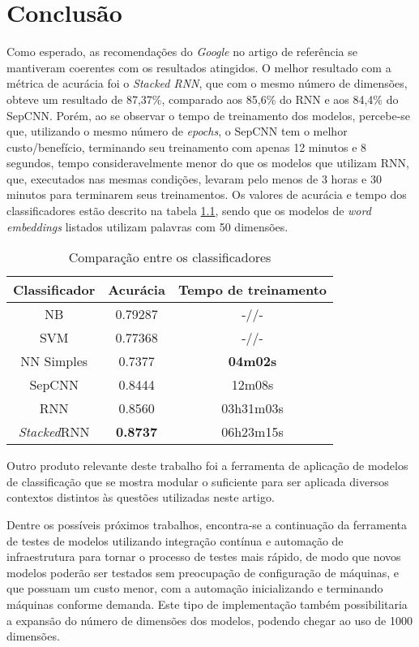 \chapter{Conclusão}
\label{chapter:conclusao}
\noindent

Como esperado, as recomendações do \textit{Google} no artigo de referência se mantiveram coerentes com os resultados atingidos. O melhor resultado com a métrica de acurácia foi o \textit{Stacked RNN}, que com o mesmo número de dimensões, obteve um resultado de 87,37\%, comparado aos 85,6\% do RNN e aos 84,4\% do SepCNN. Porém, ao se observar o tempo de treinamento dos modelos, percebe-se que, utilizando o mesmo número de \textit{epochs}, o SepCNN tem o melhor custo/benefício, terminando seu treinamento com apenas 12 minutos e 8 segundos, tempo consideravelmente menor do que os modelos que utilizam RNN, que, executados nas mesmas condições, levaram pelo menos de 3 horas e 30 minutos para terminarem seus treinamentos. Os valores de acurácia e tempo dos classificadores estão descrito na tabela \ref{tab:comparisons}, sendo que os modelos de \textit{word embeddings} listados utilizam palavras com 50 dimensões.

\begin{table}[ht]
\centering
\caption{Comparação entre os classificadores}
\vspace{0.5cm}
\begin{tabular}{c|c|c}
 
Classificador & Acurácia & Tempo de treinamento \\
\hline
NB & 0.79287 & -//- \\
SVM & 0.77368 & -//- \\
NN Simples & 0.7377 & \textbf{04m02s} \\
SepCNN & 0.8444& 12m08s \\
RNN  & 0.8560 & 03h31m03s \\
\textit{Stacked}RNN & \textbf{0.8737} & 06h23m15s
\end{tabular}
\label{tab:comparisons}
\end{table}

Outro produto relevante deste trabalho foi a ferramenta de aplicação de modelos de classificação que se mostra modular o suficiente para ser aplicada diversos contextos distintos às questões utilizadas neste artigo. 

Dentre os possíveis próximos trabalhos, encontra-se a continuação da ferramenta de testes de modelos utilizando integração contínua e automação de infraestrutura para tornar o processo de testes mais rápido, de modo que novos modelos poderão ser testados sem preocupação de configuração de máquinas, e que possuam um custo menor, com a automação inicializando e terminando máquinas conforme demanda. Este tipo de implementação também possibilitaria a expansão do número de dimensões dos modelos, podendo chegar ao uso de 1000 dimensões.

